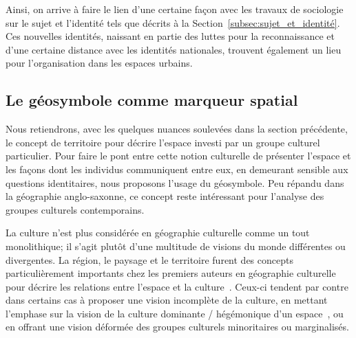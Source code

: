 Ainsi, on arrive à faire le lien d'une certaine façon avec les travaux de sociologie sur le sujet et l'identité tels que décrits à la Section~\ref{subsec:sujet_et_identité}. 
Ces nouvelles identités, naissant en partie des luttes pour la reconnaissance et d'une certaine distance avec les identités nationales, trouvent également un lieu pour l'organisation dans les espaces urbains.





\subsection{Le géosymbole comme marqueur spatial}
\label{sec:le_symbole_comme_marqueur_spatial} Nous retiendrons, avec les quelques nuances soulevées dans la section précédente, le concept de territoire pour décrire l'espace investi par un groupe culturel particulier. 
Pour faire le pont entre cette notion culturelle de présenter l'espace et les façons dont les individus communiquent entre eux, en demeurant sensible aux questions identitaires, nous proposons l'usage du géosymbole. 
Peu répandu dans la géographie anglo-saxonne, ce concept reste intéressant pour l'analyse des groupes culturels contemporains.

La culture n'est plus considérée en géographie culturelle comme un tout monolithique; il s'agit plutôt d'une multitude de visions du monde différentes ou divergentes. 
La région, le paysage et le territoire furent des concepts particulièrement importants chez les premiers auteurs en géographie culturelle pour décrire les relations entre l'espace et la culture~\citep{Bonnemaison1981,Monnet1998,DiMeo1998,}. 
Ceux-ci tendent par contre dans certains cas à proposer une vision incomplète de la culture, en mettant l'emphase sur la vision de la culture dominante / hégémonique d'un espace~\citep[11-12]{Duncan1993}, ou en offrant une vision déformée des groupes culturels minoritaires ou marginalisés.

